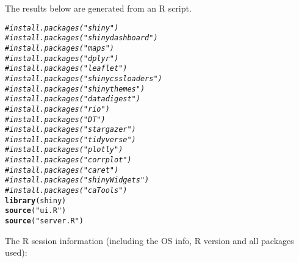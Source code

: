 \documentclass{article}\usepackage[]{graphicx}\usepackage[]{color}
\makeatletter
\newcommand{\hlstr}[1]{\textcolor[rgb]{0.192,0.494,0.8}{#1}}%
\newcommand{\hlcom}[1]{\textcolor[rgb]{0.678,0.584,0.686}{\textit{#1}}}%
\newcommand{\hlstd}[1]{\textcolor[rgb]{0.345,0.345,0.345}{#1}}%
\newcommand{\hlkwd}[1]{\textcolor[rgb]{0.737,0.353,0.396}{\textbf{#1}}}%
\newenvironment{kframe}{%
 \def\at@end@of@kframe{}%
 \ifinner\ifhmode%
  \def\at@end@of@kframe{\end{minipage}}%
  \begin{minipage}{\columnwidth}%
 \fi\fi%
 \def\FrameCommand##1{\hskip\@totalleftmargin \hskip-\fboxsep
 \colorbox{shadecolor}{##1}\hskip-\fboxsep
     \hskip-\linewidth \hskip-\@totalleftmargin \hskip\columnwidth}%
 \MakeFramed {\advance\hsize-\width
   \@totalleftmargin\z@ \linewidth\hsize
   \@setminipage}}%
 {\par\unskip\endMakeFramed%
 \at@end@of@kframe}
\newenvironment{knitrout}{}{} %
\makeatother
\begin{document}
\title{}



\maketitle
The results below are generated from an R script.

\begin{knitrout}
\color{fgcolor}\begin{kframe}
\begin{alltt}
\hlcom{#install.packages("shiny")}
\hlcom{#install.packages("shinydashboard")}
\hlcom{#install.packages("maps")}
\hlcom{#install.packages("dplyr")}
\hlcom{#install.packages("leaflet")}
\hlcom{#install.packages("shinycssloaders")}
\hlcom{#install.packages("shinythemes")}
\hlcom{#install.packages("datadigest")}
\hlcom{#install.packages("rio")}
\hlcom{#install.packages("DT")}
\hlcom{#install.packages("stargazer")}
\hlcom{#install.packages("tidyverse")}
\hlcom{#install.packages("plotly")}
\hlcom{#install.packages("corrplot")}
\hlcom{#install.packages("caret")}
\hlcom{#install.packages("shinyWidgets")}
\hlcom{#install.packages("caTools")}
\hlkwd{library}\hlstd{(shiny)}
\hlkwd{source}\hlstd{(}\hlstr{"ui.R"}\hlstd{)}
\hlkwd{source}\hlstd{(}\hlstr{"server.R"}\hlstd{)}
\end{alltt}
\end{kframe}
\end{knitrout}

The R session information (including the OS info, R version and all
packages used):
\end{document}
